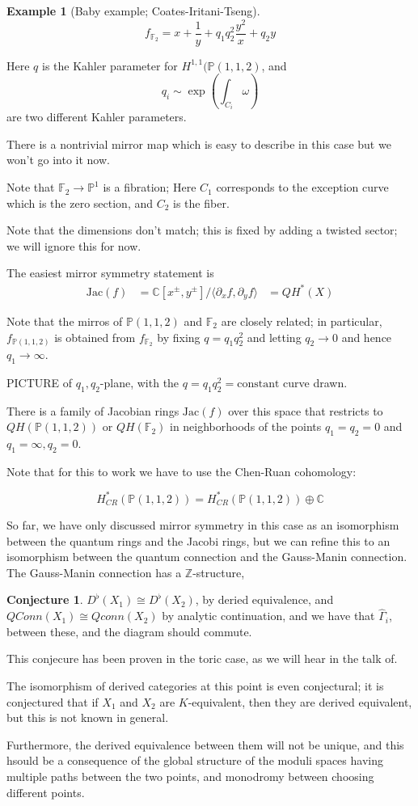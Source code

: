 \documentclass{amsart}
\theoremstyle{definition}
\newtheorem{example}[dummy]{Example}
\newtheorem{conjecture}[dummy]{Conjecture}
\newcommand{\Z}{\mathbb{Z}}
\newcommand{\proj}{\mathbb{P}}
\newcommand{\C}{\mathbb{C}}
\begin{document}
\begin{example}[Baby example; Coates-Iritani-Tseng]
$$f_{\mathbb{F}_2}=x+\frac{1}{y}+q_1q_2^2\frac{y^2}{x}+q_2 y$$

Here $q$ is the Kahler parameter for $H^{1,1}(\proj(1,1,2)$, and 
$$q_i\sim \exp\left(\int_{C_i} \omega\right)$$
are two different Kahler parameters.

There is a nontrivial mirror map which is easy to describe in this case but we won't go into it now.

Note that $\mathbb{F}_2\to\proj^1$ is a fibration;
Here $C_1$ corresponds to the exception curve which is the zero section, and $C_2$ is the fiber.

Note that the dimensions don't match; this is fixed by adding a twisted sector; we will ignore this for now.

The easiest mirror symmetry statement is
\begin{align*}
\text{Jac}(f)&=\C[x^\pm, y^\pm]/\langle\partial_xf,\partial_yf\rangle
&=QH^*(X)
\end{align*}

Note that the mirros of $\proj(1,1,2)$ and $\mathbb{F}_2$ are closely related; in particular, $f_{\proj(1,1,2)}$ is obtained from $f_{\mathbb{F}_2}$ by fixing $q=q_1q_2^2$ and letting $q_2\to 0$ and hence $q_1\to\infty$.

PICTURE of $q_1,q_2$-plane, with the $q=q_1q_2^2=\text{constant}$ curve drawn.

There is a family of Jacobian rings $\text{Jac}(f)$ over this space that restricts to $QH(\proj(1,1,2))$ or $QH(\mathbb{F}_2)$ in neighborhoods of the points $q_1=q_2=0$ and $q_1=\infty, q_2=0$.

Note that for this to work we have to use the Chen-Ruan cohomology:

$$H_{CR}^*(\proj(1,1,2))=H_{CR}^*(\proj(1,1,2))\oplus\C$$


\end{example}

So far, we have only discussed mirror symmetry in this case as an isomorphism between the quantum rings and the Jacobi rings, but we can refine this to an isomorphism between the quantum connection and the Gauss-Manin connection.  The Gauss-Manin connection has a $\Z$-structure,

\begin{conjecture}


$D^\flat(X_1)\cong D^\flat(X_2)$, by deried equivalence, and
$QConn(X_1)\cong Qconn(X_2)$ by analytic continuation, and we have that $\hat{\Gamma}_i$, between these, and the diagram should commute.
\end{conjecture}

This conjecure has been proven in the toric case, as we will hear in the talk of.

The isomorphism of derived categories at this point is even conjectural; it is conjectured that if $X_1$ and $X_2$ are $K$-equivalent, then they are derived equivalent, but this is not known in general.

Furthermore, the derived equivalence between them will not be unique, and this hsould be a consequence of the global structure of the moduli spaces having multiple paths between the two points, and monodromy between choosing different points.
\end{document}

